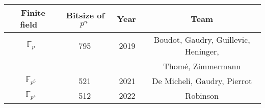 \documentclass[preview]{standalone}
\begin{document}
\begin{center}
\begin{tabular}{|c|c|c|c|}
   \hline
     $ \,$ Finite field $ \,$ &$ \,$Bitsize of $p^n \,$ &$ \,$ Year$ \,$& $ \,$Team$ \,$\\
     \hline
     $\mathbb{F}_p$ & 795 & 2019 & Boudot, Gaudry, Guillevic, Heninger, \\
     &&&Thom\'{e}, Zimmermann\\ 
    $\mathbb{F}_{p^6}$ & 521& 2021 & De Micheli, Gaudry, Pierrot\\
     $\mathbb{F}_{p^4}$ & 512& 2022 & Robinson \\ 
     \hline
   \end{tabular}
\end{center}
\end{document}
